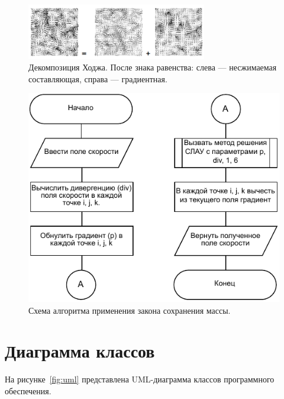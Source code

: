 \begin{figure}[H]
	\centering
	\includegraphics[width=0.7\textwidth,page=1]{assets/img/hodge.png}
	\caption{Декомпозиция Ходжа. После знака равенства: слева --- несжимаемая составляющая, справа --- градиентная.}
	\label{fig:hodge}
\end{figure}

\begin{figure}[H]
	\centering
	\includegraphics[width=1.0\textwidth,page=1]{assets/img/project.pdf}
	\caption{Схема алгоритма применения закона сохранения массы.}
	\label{fig:project}
\end{figure}

\section{Диаграмма классов}

На рисунке~\ref{fig:uml} представлена UML-диаграмма классов программного обеспечения.

